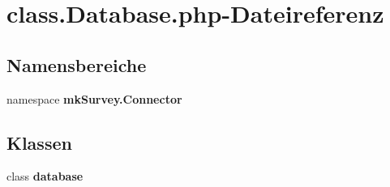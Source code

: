 \section{class.Database.php-Dateireferenz}
\label{class_8Database_8php}
\subsection*{Namensbereiche}
\begin{CompactItemize}
\item 
namespace {\bf mkSurvey.Connector}
\end{CompactItemize}
\subsection*{Klassen}
\begin{CompactItemize}
\item 
class {\bf database}
\end{CompactItemize}
